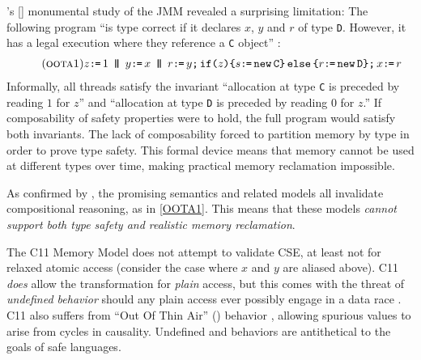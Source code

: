 \citeauthor{DBLP:journals/toplas/Lochbihler13}'s
[\citeyear{DBLP:journals/toplas/Lochbihler13}] monumental study of the JMM
revealed a surprising limitation: The following program ``is type correct if
it declares $x$, $y$ and $r$ of type \texttt{D}. However, it has a legal
execution where they reference a \texttt{C} object''
\citep[Fig.~8]{DBLP:journals/toplas/Lochbihler13}:
\begin{gather}
  \taglabel{OOTA1}
  z \GETS 1
  \PAR %
  y\GETS x
  \PAR
  \aReg\GETS y \SEMI \IF{z} \THEN \bReg \GETS \NEW \texttt{C} \ELSE \aReg \GETS \NEW \texttt{D} \FI  \SEMI x \GETS \aReg 
\end{gather}
Informally, all threads satisfy the invariant ``allocation at type \texttt{C}
is preceded by reading $1$ for $z$'' and ``allocation at type \texttt{D} is
preceded by reading $0$ for $z$.''  If composability of safety properties were to hold,
the full program would satisfy both invariants.  The lack of composability
forced \citeauthor{DBLP:journals/toplas/Lochbihler13} to partition memory by
type in order to prove type safety.  This formal device means that memory
cannot be used at different types over time, making practical memory
reclamation impossible.


As confirmed by \cite{kang,soham}, the promising semantics
\cite{DBLP:conf/popl/KangHLVD17} and related models
\citep{DBLP:conf/esop/JagadeesanPR10,DBLP:journals/pacmpl/ChakrabortyV19} all
invalidate compositional reasoning, as in \ref{OOTA1}.  %
This means that these models \emph{cannot support both type safety and
  realistic memory reclamation}.


The C11 Memory Model \cite{Batty:2011:MCC:1926385.1926394} does not attempt
to validate CSE, at least not for relaxed atomic access (consider the case
where $x$ and $y$ are aliased above).  C11 \emph{does} allow the
transformation for \emph{plain} access, but this comes with the threat of
\emph{undefined behavior} should any plain access ever possibly engage in a
data race \cite{undefined}.  C11 also suffers from ``Out Of Thin Air''
(\oota) behavior \cite{DBLP:conf/esop/BattyMNPS15}, allowing spurious values
to arise from cycles in causality.  Undefined and \oota{} behaviors are
antithetical to the goals of safe languages.


